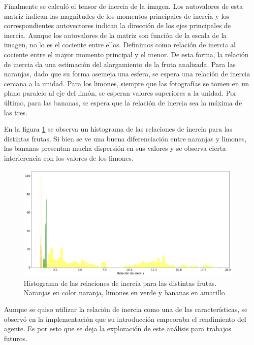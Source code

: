 \documentclass[10pt, a4paper]{article}
\begin{document}
Finalmente se calculó el tensor de inercia de la imagen. Los autovalores de esta matriz indican las magnitudes de los momentos principales de inercia y los correspondientes autovectores indican la dirección de los ejes principales de inercia. Aunque los autovalores de la matriz son función de la escala de la imagen, no lo es el cociente entre ellos. Definimos como relación de inercia al cociente entre el mayor momento principal y el menor. De esta forma, la relación de inercia da una estimación del alargamiento de la fruta analizada. Para las naranjas, dado que su forma asemeja una esfera, se espera una relación de inercia cercana a la unidad. Para los limones, siempre que las fotografías se tomen en un plano paralelo al eje del limón, se esperan valores superiores a la unidad. Por último, para las bananas, se espera que la relación de inercia sea la máxima de las tres. 

En la figura \ref{fig:hist_inertia_ratio} se observa un histograma de las relaciones de inercia para las distintas frutas. Si bien se ve una buena diferenciación entre naranjas y limones, las bananas presentan mucha dispersión en sus valores y se observa cierta interferencia con los valores de los limones.

\begin{figure}[h]
    \centering
    \includegraphics[width=1\textwidth]{histogram_inertia.png}
    \caption{Histograma de las relaciones de inercia para las distintas frutas. Naranjas en color naranja, limones en verde y bananas en amarillo}
    \label{fig:hist_inertia_ratio}
\end{figure}

Aunque se quiso utilizar la relación de inercia como una de las características, se observó en la implementación que su introducción empeoraba el rendimiento del agente. Es por esto que se deja la exploración de este análisis para trabajos futuros.
\end{document}
